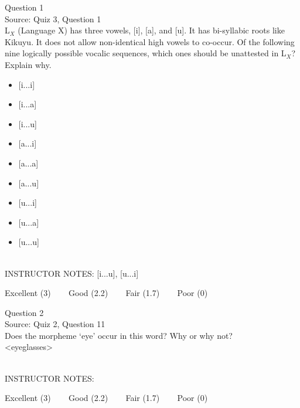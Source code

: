 \documentclass[12pt]{article}
\begin{document}
\begin{center}
\textbf{{\color{blue}{\HUGE START OF EXAM\\}}}

\textbf{{\color{blue}{\HUGE Student ID: 4066\\}}}

\textbf{{\color{blue}{\HUGE 4:00 - 4:15 PM\\}}}

\end{center}
\newpage

{\large Question 1}\\

Source: Quiz 3, Question 1\\

L$_X$ (Language X) has three vowels, [i], [a], and [u]. It has bi-syllabic roots like Kikuyu. It does not allow non-identical high vowels to co-occur. Of the following nine logically possible vocalic sequences, which ones should be unattested in L$_X$? Explain why.\\

\begin{itemize} \item {[i...i]} \item {[i...a]} \item {[i...u]} \item {[a...i]} \item {[a...a]} \item {[a...u]} \item {[u...i]} \item {[u...a]} \item {[u...u]} \end{itemize}


~\\
INSTRUCTOR NOTES: [i...u], [u...i]


\vfill
Excellent (3) ~~~ Good (2.2) ~~~ Fair (1.7) ~~~ Poor (0)
\newpage

{\large Question 2}\\

Source: Quiz 2, Question 11\\

Does the morpheme ‘eye’ occur in this word? Why or why not?\\

<eyeglasses>


~\\
INSTRUCTOR NOTES: 


\vfill
Excellent (3) ~~~ Good (2.2) ~~~ Fair (1.7) ~~~ Poor (0)
\newpage
\end{document}
